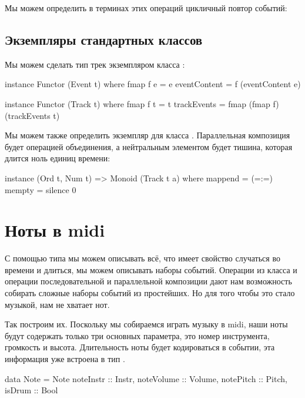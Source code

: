 Мы можем определить в терминах этих операций цикличный повтор событий:



\subsection{Экземпляры стандартных классов}

Мы можем сделать тип трек экземпляром класса :


\begin{code}
instance Functor (Event t) where
    fmap f e = e{ eventContent = f (eventContent e) }

instance Functor (Track t) where
    fmap f t = t{ trackEvents = fmap (fmap f) (trackEvents t) }
\end{code}

Мы можем также определить экземпляр для класса . Параллельная
композиция будет операцией объединения, а нейтральным элементом будет
тишина, которая длится ноль единиц времени:


\begin{code}
instance (Ord t, Num t) => Monoid (Track t a) where
    mappend = (=:=)
    mempty  = silence 0
\end{code}

\section{Ноты в midi}

С помощью типа  мы можем описывать всё, что имеет свойство
случаться во времени и длиться, мы можем описывать наборы событий.
Операции из класса  и операции последовательной и
параллельной композиции дают нам возможность собирать сложные наборы
событий из простейших. Но для того чтобы это стало музыкой, нам не
хватает нот.

Так построим их. Поскольку мы собираемся играть музыку в midi, наши ноты
будут содержать только три основных параметра, это номер инструмента,
громкость и высота. Длительность ноты будет кодироваться в событии, эта
информация уже встроена в тип .


\begin{code}
data Note = Note {
    noteInstr   :: Instr,
    noteVolume  :: Volume,
    notePitch   :: Pitch,
    isDrum      :: Bool  }
\end{code}

